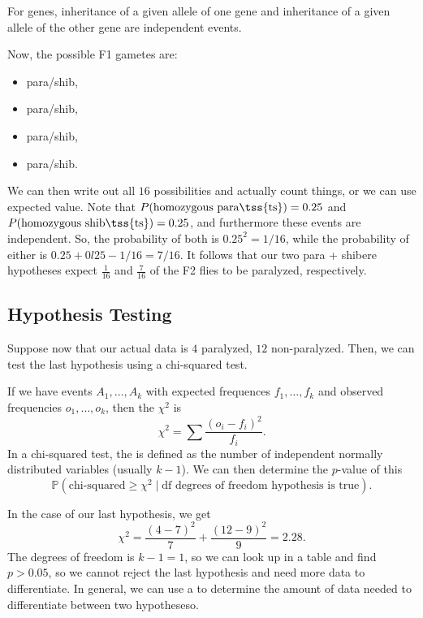 \begin{law}
	For  genes, inheritance of a given allele of one gene and inheritance of a given allele of the other gene are independent events.
\end{law}

Now, the possible F1 gametes are:

\begin{itemize}
	\item para/shib,
	\item para/shib,
	\item para/shib, 
	\item para/shib.
\end{itemize}

We can then write out all $16$ possibilities and actually count things, or we can use expected value. Note that $P(\text{homozygous para\tss{ts}}) = 0.25$ and $P(\text{homozygous shib\tss{ts}}) = 0.25$, and furthermore these events are independent. So, the probability of both is $0.25^2 = 1/16$, while the probability of either is $0.25 + 0l25 - 1/16 = 7/16$. It follows that our two para + shibere hypotheses expect $\frac 1{16}$ and $\frac 7{16}$ of the F2 flies to be paralyzed, respectively.

\subsection{Hypothesis Testing}

Suppose now that our actual data is $4$ paralyzed, $12$ non-paralyzed. Then, we can test the last hypothesis using a chi-squared test.

\begin{defn}
	If we have events $A_1, \ldots, A_k$ with expected frequences $f_1,\ldots, f_k$ and observed frequencies $o_1, \ldots, o_k$, then the  $\chi^2$ is \[
		\chi^2 = \sum \frac{(o_i-f_i)^2}{f_i}.
	\]
	In a chi-squared test, the  is defined as the number of independent normally distributed variables (usually $k-1$). We can then determine the $p$-value of this \[
		\mathbb P(\text{chi-squared} \geq \chi^2 \mid \text{df degrees of freedom hypothesis is true}).
	\]
\end{defn}

In the case of our last hypothesis, we get \[
	\chi^2 = \frac{(4-7)^2}{7} + \frac{(12-9)^2}{9} = 2.28.
\]
The degrees of freedom is $k-1 = 1$, so we can look up in a table and find $p > 0.05$, so we cannot reject the last hypothesis and need more data to differentiate. In general, we can use a  to determine the amount of data needed to differentiate between two hypotheseso.

